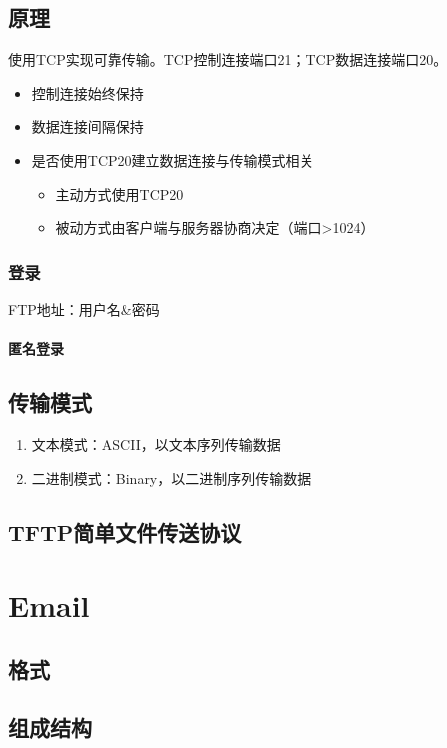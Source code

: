 \subsection{原理}

使用TCP实现可靠传输。TCP控制连接端口21；TCP数据连接端口20。
\begin{itemize}
    \item 控制连接始终保持
    \item 数据连接间隔保持
    \item 是否使用TCP20建立数据连接与传输模式相关\begin{itemize}
        \item 主动方式使用TCP20
        \item 被动方式由客户端与服务器协商决定（端口>1024）
    \end{itemize}
\end{itemize}

\subsubsection{登录}
FTP地址：用户名\&密码

\paragraph{匿名登录}


\subsection{传输模式}
\begin{enumerate}
    \item 文本模式：ASCII，以文本序列传输数据
    \item 二进制模式：Binary，以二进制序列传输数据
\end{enumerate}


\subsection{TFTP简单文件传送协议}


\section{Email}

\subsection{格式}


\subsection{组成结构}

